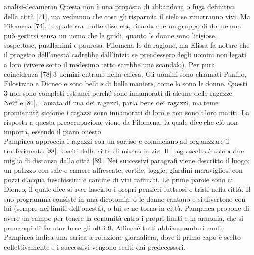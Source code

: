 \documentclass[preview]{standalone}
\begin{document}
\begin{snippet}{analisi-decameron}
    Questa non è una proposta di abbandona o fuga definitiva della città [71],
    ma vedranno che cosa gli risparmia il cielo se rimarranno vivi.
    Ma Filomena [74], la quale era molto discreta, ricorda che un gruppo di donne non può gestirsi
    senza un uomo che le guidi, quanto le donne sono litigiose, sospettose, pusillanimi e paurosa.
    Filomena le da ragione, ma Elissa fa notare che il progetto dell'onestà cadrebbe dall'inizio se
    prendessero degli uomini non legati a loro (vivere sotto il medesimo tetto sarebbe uno scandalo).
    Per pura coincidenza [78] 3 uomini entrano nella chiesa. Gli uomini sono chiamati Panfilo, Filostrato e Dioneo
    e sono belli e di belle maniere, come lo sono le donne.
    Questi 3 non sono completi estranei perché sono innamorati di alcune delle ragazze.
    Neifile [81], l'amata di una dei ragazzi, parla bene dei ragazzi, ma teme
    promiscuità siccome i ragazzi sono innamorati di loro e non sono i loro mariti.
    La risposta a questa preoccupazione viene da Filomena, la quale dice che ciò non importa,
    essendo il piano onesto. \\
    Pampinea approccia i ragazzi con un sorriso e cominciano ad organizzare il trasferimento [88].
    Usciti dalla città di misero in via. Il luogo scelto è solo a due miglia di distanza dalla città [89].
    Nei successivi paragrafi viene descritto il luogo: un palazzo con sale e camere affrescate, cortile, loggie,
    giardini meravigliosi con pozzi d'acqua freschissimi e cantine di vini raffinati.
    Le prime parole sono di Dioneo, il quale dice si aver lasciato i propri pensieri luttuosi e tristi nella città.
    Il suo programma consiste in una dicotomia: o le donne cantano e si divertono con lui
    (sempre nei limiti dell'onestà), o lui se ne torna in città.
    Pampinea propone di avere un campo per tenere la comunità entro i propri limiti e in armonia,
    che si preoccupi di far star bene gli altri 9.
    Affinché tutti abbiano ambo i ruoli, Pampinea indica una carica a rotazione giornaliera,
    dove il primo capo è scelto collettivamente e i successivi vengono scelti dai predecessori.
\end{snippet}
\end{document}
